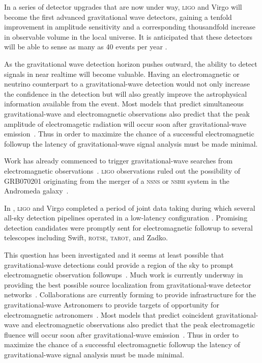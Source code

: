 In a series of detector upgrades that are now under way, \textsc{ligo} and Virgo will become the first advanced gravitational wave detectors, gaining a tenfold improvement in amplitude sensitivity \citeneeded{} and a corresponding thousandfold increase in observable volume in the local universe.  It is anticipated that these detectors will be able to sense as many as 40 events per year \cite{Abadie:2010p10836}.

As the gravitational wave detection horizon pushes outward, the ability to detect signals in near realtime will become valuable.  Having an electromagnetic or neutrino counterpart to a 
gravitational-wave detection would not only increase the confidence in 
the detection but will also greatly improve the astrophysical information
available from the event.  Most models that predict simultaneous
gravitational-wave and electromagnetic observations also predict that the
peak amplitude of electromagetic radiation will occur soon after 
gravitational-wave emission~\cite{sylvestre2003}.  Thus in order to maximize
the chance of a successful electromagnetic followup the latency of 
gravitational-wave signal analysis must be made minimal.

 Work has already commenced to trigger gravitational-wave searches from 
electromagnetic observations~\cite{triggeredsearches2008}. \textsc{ligo} observations
ruled out the possibility of GRB070201 originating from the merger of a
\textsc{nsns} or \textsc{nsbh} system in the Andromeda galaxy~\cite{GRB070201}.

In , \textsc{ligo} and Virgo completed a period of joint data taking during which several all-sky detection pipelines operated in a low-latency configuration \citeneeded.  Promising detection candidates were promptly sent for electromagnetic followup \citeneeded{} to several telescopes including Swift, \textsc{rotse}, \textsc{tarot}, and Zadko.


This question has been investigated and it seems  at least
possible that gravitational-wave detections could provide a region of the
sky to prompt electromagnetic observation followups~\cite{sylvestre2003}.
 Much work is currently underway in providing the best possible source 
localization from gravitational-wave detector networks~\cite{markowitz2008, raymond2008, cavalier2006}.  Collaborations are currently forming to provide infrastructure for the gravitational-wave
Astronomers to provide targets of opportunity for electromagnetic 
astronomers~\cite{kanner2008}.  Most models that predict coincident
gravitational-wave and electromagnetic observations also predict that the
peak electromagetic fluence will occur soon after 
gravitational-wave emission~\cite{sylvestre2003}.  Thus in order to maximize
the chance of a successful electromagnetic followup the latency of 
gravitational-wave signal analysis must be made minimal.

